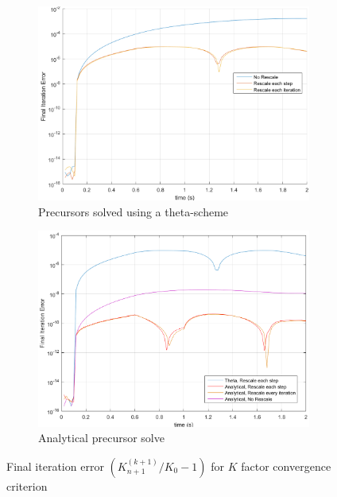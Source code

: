\documentclass{elsarticle}
\begin{document}
\begin{figure}[!htbp]
\centering
\begin{subfigure}[b]{0.49\textwidth}
\centering
\includegraphics[width=0.99\textwidth]{figures/iter_error.png}
\caption{Precursors solved using a theta-scheme}
\label{fig:iter_err}
\end{subfigure}
\begin{subfigure}[b]{0.49\textwidth}
\centering
\includegraphics[width=0.99\textwidth]{figures/iter_error_an.png}
\caption{Analytical precursor solve}
\label{fig:iter_err_an}
\end{subfigure}
\caption{Final iteration error $\left(K_{n+1}^{(k+1)}/K_0 - 1\right)$ for $K$ factor convergence criterion}
\end{figure}
\end{document}
